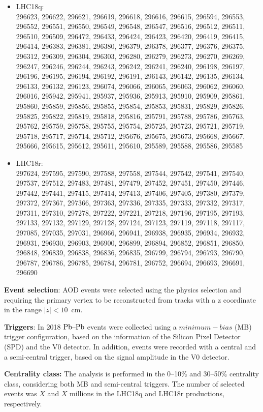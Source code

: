 \begin{itemize}
\item LHC18q:\\
 296623, 296622, 296621, 296619, 296618, 296616, 296615, 296594, 296553, 296552, 296551, 296550, 296549, 296548, 296547, 296516, 296512, 296511, 296510, 296509, 296472, 296433, 296424, 296423, 296420, 296419, 296415, 296414, 296383, 296381, 296380, 296379, 296378, 296377, 296376, 296375, 296312, 296309, 296304, 296303, 296280, 296279, 296273, 296270, 296269, 296247, 296246, 296244, 296243, 296242, 296241, 296240, 296198, 296197, 296196, 296195, 296194, 296192, 296191, 296143, 296142, 296135, 296134, 296133, 296132, 296123, 296074, 296066, 296065, 296063, 296062, 296060, 296016, 295942, 295941, 295937, 295936, 295913, 295910, 295909, 295861, 295860, 295859, 295856, 295855, 295854, 295853, 295831, 295829, 295826, 295825, 295822, 295819, 295818, 295816, 295791, 295788, 295786, 295763, 295762, 295759, 295758, 295755, 295754, 295725, 295723, 295721, 295719, 295718, 295717, 295714, 295712, 295676, 295675, 295673, 295668, 295667, 295666, 295615, 295612, 295611, 295610, 295589, 295588, 295586, 295585 
\item LHC18r:\\
 297624, 297595, 297590, 297588, 297558, 297544, 297542, 297541, 297540, 297537, 297512, 297483, 297481, 297479, 297452, 297451, 297450, 297446, 297442, 297441, 297415, 297414, 297413, 297406, 297405, 297380, 297379, 297372, 297367, 297366, 297363, 297336, 297335, 297333, 297332, 297317, 297311, 297310, 297278, 297222, 297221, 297218, 297196, 297195, 297193, 297133, 297132, 297129, 297128, 297124, 297123, 297119, 297118, 297117, 297085, 297035, 297031, 296966, 296941, 296938, 296935, 296934, 296932, 296931, 296930, 296903, 296900, 296899, 296894, 296852, 296851, 296850, 296848, 296839, 296838, 296836, 296835, 296799, 296794, 296793, 296790, 296787, 296786, 296785, 296784, 296781, 296752, 296694, 296693, 296691, 296690 
\end{itemize}

{\bf Event selection}: AOD events were selected using the physics selection and requiring the primary vertex to be reconstructed from tracks with a z coordinate in the range $|z|<10$~cm.

{\bf Triggers}: In 2018 $\mbox{Pb--Pb}$ events were collected using a $minimum-bias$ (MB) trigger configuration, based on the information of the Silicon Pixel Detector (SPD) and the V0 detector. In addition, events were recorded with a central and a semi-central trigger, based on the signal amplitude in the V0 detector.

{\bf Centrality class:} The analysis is performed in the 0--10\% and 30--50\% centrality class, considering both MB and semi-central triggers. The number of selected events was $X$ and $X$ millions in the LHC18q and LHC18r productions, respectively.
